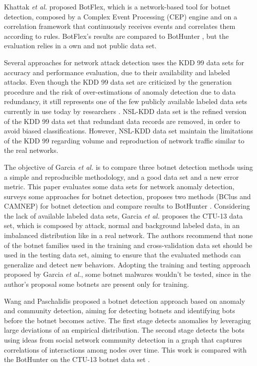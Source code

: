 \documentclass[review]{elsarticle}
\begin{document}
Khattak \emph{et al.} \cite{khattak2015botflex} proposed BotFlex, which is a network-based tool for botnet detection, composed by a Complex Event Processing (CEP) engine and on a correlation framework that continuously receives events and correlates them according to rules. BotFlex's results are compared to BotHunter \cite{gu2007bothunter}, but the evaluation relies in a own and not public data set.

Several approaches for network attack detection uses the KDD 99 \cite{ahmed2016survey,osanaiye2016distributed,bhuyan2014network} data sets for accuracy and performance evaluation, due to their availability and labeled attacks. Even though the KDD 99 data set are criticized by the generation procedure and the risk of over-estimations of anomaly detection due to data redundancy, it still represents one of the few publicly available labeled data sets currently in use today by researchers \cite{osanaiye2016distributed,bhuyan2014network}. NSL-KDD \cite{tavallaee2009detailed} data set is the refined version of the KDD 99 data set that redundant data records are removed, in order to avoid biased classifications. However, NSL-KDD data set maintain the limitations of the KDD 99 regarding volume and reproduction of network traffic similar to the real networks.

The objective of Garcia \emph{et al.} \cite{garcia2014empirical} is to compare three botnet detection methods using a simple and reproducible methodology, and a good data set and a new error metric. This paper evaluates some data sets for network anomaly detection, surveys some approaches for botnet detection, proposes two methods (BClus and CAMNEP) for botnet detection and compare results to BotHunter \cite{gu2007bothunter}. Considering the lack of available labeled data sets, Garcia \emph{et al.} \cite{garcia2014empirical} proposes the CTU-13 data set, which is composed by attack, normal and background labeled data, in an imbalanced distribution like in a real network. The authors recommend that none of the botnet families used in the training and cross-validation data set should be used in the testing data set, aiming to ensure that the evaluated methods can generalize and detect new behaviors. Adopting the training and testing approach proposed by Garcia \emph{et al.}, some botnet malwares wouldn't be tested, since in the author's proposal some botnets are present only for training. 

Wang and Paschalidis \cite{wang2017botnet} proposed a botnet detection approach based on anomaly and community detection, aiming for detecting botnets and identifying bots before the botnet becomes active. The first stage detects anomalies by leveraging large deviations of an empirical distribution. The second stage detects the bots using ideas from social network community detection in a graph that captures correlations of interactions among nodes over time. This work is compared with the BotHunter \cite{gu2007bothunter} on the CTU-13 botnet data set \cite{garcia2014empirical}.
\end{document}

